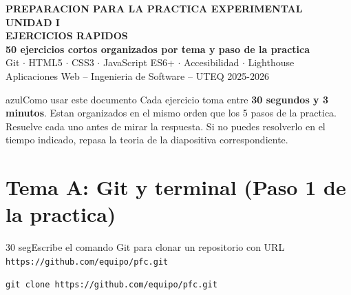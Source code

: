\documentclass[11pt,a4paper]{article}
\newcounter{nej}
\newcommand{\ej}[2]{%
	\stepcounter{nej}%
	\begin{ejercicio}{\arabic{nej}}{#1}#2\end{ejercicio}\vspace{4pt}}
\begin{document}
	
	\begin{cajabanda}
		\begin{center}
			{\scriptsize\bfseries PREPARACION PARA LA PRACTICA EXPERIMENTAL UNIDAD I}\\[5pt]
			{\LARGE\bfseries EJERCICIOS RAPIDOS}\\[3pt]
			{\large\bfseries 50 ejercicios cortos organizados por tema y paso de la practica}\\[3pt]
			{\normalsize Git $\cdot$ HTML5 $\cdot$ CSS3 $\cdot$ JavaScript ES6+ $\cdot$ Accesibilidad $\cdot$ Lighthouse}\\[5pt]
			{\small Aplicaciones Web -- Ingenieria de Software -- UTEQ 2025-2026}
		\end{center}
	\end{cajabanda}
	
	\vspace{0.3cm}
	
	\begin{cajatip}{azul}{Como usar este documento}
		Cada ejercicio toma entre \textbf{30 segundos y 3 minutos}. Estan organizados en el mismo orden que los 5 pasos de la practica. Resuelve cada uno antes de mirar la respuesta. Si no puedes resolverlo en el tiempo indicado, repasa la teoria de la diapositiva correspondiente.
	\end{cajatip}
	
	\vspace{0.3cm}
	\tableofcontents
	\vspace{0.5cm}
	
	\section{Tema A: Git y terminal (Paso 1 de la practica)}
	
	\ej{30 seg}{Escribe el comando Git para clonar un repositorio con URL \texttt{https://github.com/equipo/pfc.git}}
	
	\begin{respuesta}
		\begin{lstlisting}[style=codebash]
			git clone https://github.com/equipo/pfc.git
		\end{lstlisting}
	\end{respuesta}
	\vspace{6pt}
	
\end{document}

